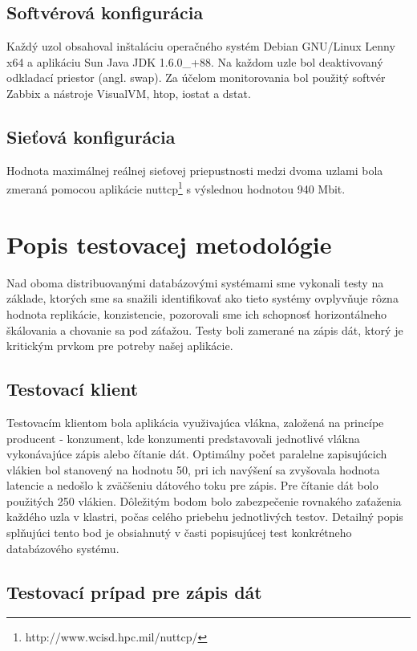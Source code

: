 \documentclass[11pt,twoside,a4paper]{book}
\begin{document}
\subsection*{Softvérová konfigurácia} 
Každý uzol obsahoval inštaláciu operačného systém Debian GNU/Linux Lenny x64 a aplikáciu Sun Java JDK 1.6.0\_+88. Na každom uzle bol deaktivovaný odkladací priestor (angl. swap). Za účelom monitorovania bol použitý softvér Zabbix a nástroje VisualVM, htop, iostat a dstat.

\subsection*{Sieťová konfigurácia}

Hodnota maximálnej reálnej sieťovej priepustnosti medzi dvoma uzlami bola zmeraná pomocou aplikácie nuttcp\footnote{http://www.wcisd.hpc.mil/nuttcp/} s výslednou hodnotou 940 Mbit.

\section{Popis testovacej metodológie}

Nad oboma distribuovanými databázovými systémami sme vykonali testy na základe, ktorých sme sa snažili identifikovať ako tieto systémy ovplyvňuje rôzna hodnota replikácie, konzistencie, pozorovali sme ich schopnosť horizontálneho škálovania a chovanie sa pod záťažou. Testy boli zamerané na zápis dát, ktorý je kritickým prvkom pre potreby našej aplikácie.

\subsection{Testovací klient}

Testovacím klientom bola aplikácia využivajúca vlákna, založená na princípe producent - konzument, kde konzumenti predstavovali jednotlivé vlákna vykonávajúce zápis alebo čítanie dát. Optimálny počet paralelne zapisujúcich vlákien bol stanovený na hodnotu 50, pri ich navýšení sa zvyšovala hodnota latencie a nedošlo k zväčšeniu dátového toku pre zápis. Pre čítanie dát bolo použitých 250 vlákien. Dôležitým bodom bolo zabezpečenie rovnakého zaťaženia každého uzla v klastri, počas celého priebehu jednotlivých testov. Detailný popis splňujúci tento bod je obsiahnutý v časti popisujúcej test konkrétneho databázového systému.

\subsection{Testovací prípad pre zápis dát}
\end{document}
